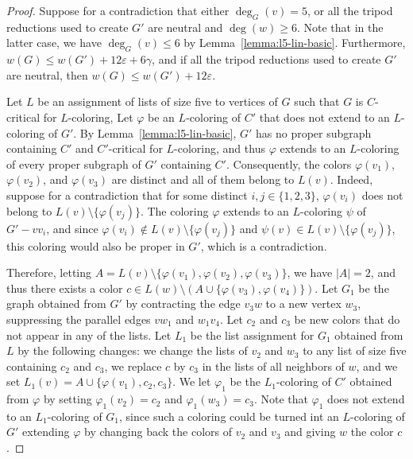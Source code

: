 \documentclass[12pt,twoside,openright,a4paper]{book}
\begin{document}
\begin{proof}
Suppose for a contradiction that either $\deg_G(v)=5$, or all the tripod reductions
used to create $G'$ are neutral and $\deg(w)\ge 6$.  Note that in the latter case, we have $\deg_G(v)\le 6$
by Lemma~\ref{lemma:l5-lin-basic}.
Furthermore, $w(G)\le w(G')+12\varepsilon+6\gamma$, and if all the tripod reductions used to create $G'$ are neutral,
then $w(G)\le w(G')+12\varepsilon$.  

Let $L$ be an assignment of lists of size five to vertices of $G$ such that $G$ is $C$-critical for $L$-coloring,
Let $\varphi$ be an $L$-coloring of $C'$ that does not extend to an $L$-coloring of $G'$.  By Lemma~\ref{lemma:l5-lin-basic},
$G'$ has no proper subgraph containing $C'$ and $C'$-critical for $L$-coloring, and thus $\varphi$ extends to an $L$-coloring
of every proper subgraph of $G'$ containing $C'$.  Consequently, the colors $\varphi(v_1)$, $\varphi(v_2)$, and $\varphi(v_3)$
are distinct and all of them belong to $L(v)$.  Indeed, suppose for a contradiction that for some distinct $i,j\in\{1,2,3\}$,
$\varphi(v_i)$ does not belong to $L(v)\setminus \{\varphi(v_j)\}$.  The coloring $\varphi$ extends to an $L$-coloring $\psi$
of $G'-vv_i$, and since $\varphi(v_i)\not\in L(v)\setminus \{\varphi(v_j)\}$ and $\psi(v)\in L(v)\setminus \{\varphi(v_j)\}$,
this coloring would also be proper in $G'$, which is a contradiction.

Therefore, letting $A=L(v)\setminus\{\varphi(v_1),\varphi(v_2),\varphi(v_3)\}$, we have $|A|=2$, and thus there exists a color
$c\in L(w)\setminus (A\cup\{\varphi(v_3),\varphi(v_4)\})$.  Let $G_1$ be the graph obtained from $G'$ by contracting the edge
$v_3w$ to a new vertex $w_3$, suppressing the parallel edges $vw_1$ and $w_1v_4$.  Let $c_2$ and $c_3$ be new colors that do not
appear in any of the lists.  Let $L_1$ be the list assignment for $G_1$ obtained from $L$ by the following changes:
we change the lists of $v_2$ and $w_3$  to any list of size five containing $c_2$ and $c_3$, we replace $c$ by $c_3$
in the lists of all neighbors of $w$, and we set $L_1(v)=A\cup\{\varphi(v_1),c_2,c_3\}$.  We let $\varphi_1$ be the $L_1$-coloring
of $C'$ obtained from $\varphi$ by setting $\varphi_1(v_2)=c_2$ and $\varphi_1(w_3)=c_3$.
Note that $\varphi_1$ does not extend to an $L_1$-coloring of $G_1$, since such a coloring could be turned int an $L$-coloring of $G'$
extending $\varphi$ by changing back the colors of $v_2$ and $v_3$ and giving $w$ the color $c$.


\end{proof}
\end{document}
